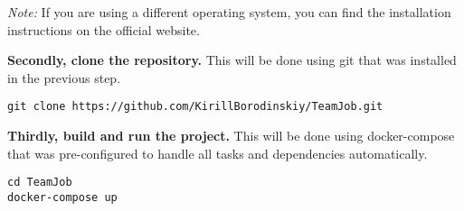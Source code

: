 \textit{Note:} If you are using a different operating system, you can find the installation instructions on the official website.

\textbf{Secondly, clone the repository.} This will be done using git that was installed in the previous step.
\begin{verbatim}
git clone https://github.com/KirillBorodinskiy/TeamJob.git
\end{verbatim}

\textbf{Thirdly, build and run the project.} This will be done using docker-compose that was pre-configured to handle all tasks and dependencies automatically.
\begin{verbatim}
cd TeamJob
docker-compose up
\end{verbatim}

